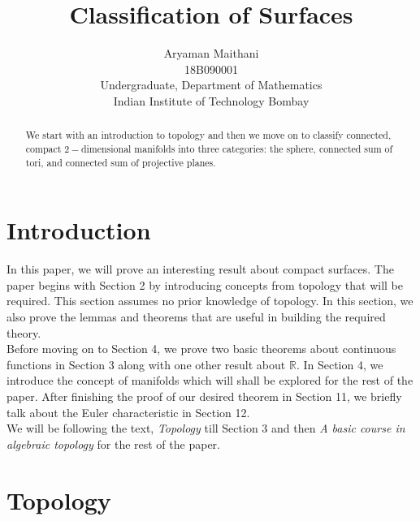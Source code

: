 \documentclass{article}
\title{Classification of Surfaces}
\author{
  Aryaman Maithani\\
  18B090001\\
  Undergraduate, Department of Mathematics\\
  Indian Institute of Technology Bombay\\
}
\theoremstyle{definition}
\begin{document}
\maketitle
\begin{adjustwidth}{20mm}{20mm}
  \begin{abstract}
    We start with an introduction to topology and then we move on to classify connected, compact $2-$dimensional manifolds into three categories: the sphere, connected sum of tori, and connected sum of projective planes.
  \end{abstract}
\end{adjustwidth}
\tableofcontents

%
\section{Introduction}
  In this paper, we will prove an interesting result about compact surfaces. The paper begins with Section 2 by introducing concepts from topology that will be required. This section assumes no prior knowledge of topology. In this section, we also prove the lemmas and theorems that are useful in building the required theory.\\
  Before moving on to Section 4, we prove two basic theorems about continuous functions in Section 3 along with one other result about $\mathbb{R}.$
  In Section 4, we introduce the concept of manifolds which will shall be explored for the rest of the paper. After finishing the proof of our desired theorem in Section 11, we briefly talk about the Euler characteristic in Section 12.\\
  We will be following the text, \emph{Topology} \cite{book:munk} till Section 3 and then \emph{A basic course in algebraic topology} \cite{book:mass} for the rest of the paper. 
%
\section{Topology}
\end{document}
